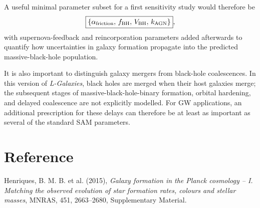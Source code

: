 \documentclass[11pt,a4paper]{article}
\begin{document}
A useful minimal parameter subset for a first sensitivity study would therefore be
\begin{equation*}
\boxed{\left\{\alpha_{\rm friction},\,f_{\rm BH},\,V_{\rm BH},\,k_{\rm AGN}\right\}},
\end{equation*}
with supernova-feedback and reincorporation parameters added afterwards to quantify how uncertainties in galaxy formation propagate into the predicted massive-black-hole population.

It is also important to distinguish galaxy mergers from black-hole coalescences. In this version of \textit{L-Galaxies}, black holes are merged when their host galaxies merge; the subsequent stages of massive-black-hole-binary formation, orbital hardening, and delayed coalescence are not explicitly modelled. For GW applications, an additional prescription for these delays can therefore be at least as important as several of the standard SAM parameters.


\section*{Reference}
Henriques, B. M. B. et al. (2015), \textit{Galaxy formation in the Planck cosmology -- I. Matching the observed evolution of star formation rates, colours and stellar masses}, MNRAS, 451, 2663--2680, Supplementary Material.
\end{document}
